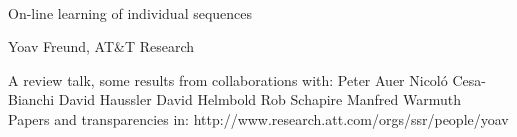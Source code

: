 
\newcommand{\withpsfigs}[1]{#1}
\withpsfigs{}

\oddsidemargin=1pt
\evensidemargin=1pt

\newcommand{\loss}[2]{\ell_{#1}^{#2}} %
\newcommand{\TEloss}[1]{L_{#1}}	%
\newcommand{\BEloss}{L_{\min}}	%
\newcommand{\TAloss}{L_A}	%
\newcommand{\weight}[2]{W_{#1}^{#2}} %
\newcommand{\Nweight}[2]{V_{#1}^{#2}}	%
\newcommand{\dweight}[2]{w^{#2}(#1)} %
\newcommand{\btheta}{\hat{\theta}}

\newcommand{\bt}{$\bullet$~}

\textwidth=6.5in
\topmargin=-20pt
\headheight=12pt
\headsep=12pt
\textheight=8.5in

\def\topfraction{0.99}
\def\floatpagefraction{0.99}
\def\textfraction{0.1} %

\pagestyle{empty}


\newcommand{\mRule}{\rule{6.35in}{0.01in}}


\begin{LARGE}
\begin{center}
~\newline \newline \newline \newline 
\begin{Huge}
On-line learning of individual sequences
\end{Huge}
\newline \newline \newline \newline 
Yoav Freund, AT\&T Research
\end{center}
\vspace{1in}
A review talk, some results from collaborations with:\newline
\newline
Peter Auer \newline\newline
Nicol\'{o} Cesa-Bianchi \newline\newline
David Haussler \newline\newline
David Helmbold \newline\newline
Rob Schapire \newline\newline
Manfred Warmuth
~\newline\newline\newline
Papers and transparencies in:\newline
http://www.research.att.com/orgs/ssr/people/yoav
\end{LARGE}

